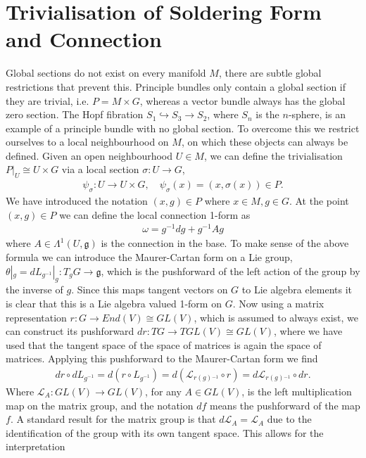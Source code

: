 \documentclass[10pt]{report}
\theoremstyle{definition}
\begin{document}
\section{Trivialisation of Soldering Form and Connection}
Global sections do not exist on every manifold $M$, there are subtle global restrictions that prevent this. Principle bundles only contain a global section if they are trivial, i.e. $P = M \times G$, whereas a vector bundle always has the global zero section. The Hopf fibration $S_1 \hookrightarrow S_3 \rightarrow S_2$, where $S_n$ is the $n$-sphere, is an example of a principle bundle with no global section. To overcome this we restrict ourselves to a local neighbourhood on $M$, on which these objects can always be defined. Given an open neighbourhood $U \in M$, we can define the trivialisation $P|_U \cong U \times G$ via a local section $\sigma : U \rightarrow G$,
\begin{align}
    \psi_\sigma : U \rightarrow U \times G, \quad \psi_\sigma(x) = (x,\sigma(x)) \in P.
\end{align}
We have introduced the notation $(x,g) \in P$ where $x \in M, g \in G$. At the point $(x,g) \in P$ we can define the local connection 1-form as 
\begin{align}
    \omega = g^{-1} dg + g^{-1} A g \label{eq:fibre-local-connection}
\end{align}
where $A \in \Lambda^1(U,\mathfrak{g})$ is the connection in the base. To make sense of the above formula we can introduce the Maurer-Cartan form on a Lie group, $\theta |_g = d L_{g^{-1}}|_g : T_g G \rightarrow \mathfrak{g}$, which is the pushforward of the left action of the group by the inverse of $g$. Since this maps tangent vectors on $G$ to Lie algebra elements it is clear that this is a Lie algebra valued 1-form on $G$. Now using a matrix representation $r : G \rightarrow End(V) \cong GL(V)$, which is assumed to always exist, we can construct its pushforward $dr : TG \rightarrow T GL(V) \cong GL(V)$, where we have used that the tangent space of the space of matrices is again the space of matrices. Applying this pushforward to the Maurer-Cartan form we find
\begin{align*}
    dr \circ d L_{g^{-1}} = d(r\circ L_{g^{-1}}) = d (\mathcal{L}_{r(g){}^{-1}} \circ r) = d \mathcal{L}_{r(g){}^{-1}} \circ dr.
\end{align*}
Where $\mathcal{L}_A : GL(V) \rightarrow GL(V)$, for any $A \in GL(V)$, is the left multiplication map on the matrix group, and the notation $df$ means the pushforward of the map $f$. A standard result for the matrix group is that $d\mathcal{L}_A = \mathcal{L}_A$ due to the identification of the group with its own tangent space. This allows for the interpretation
\end{document}
